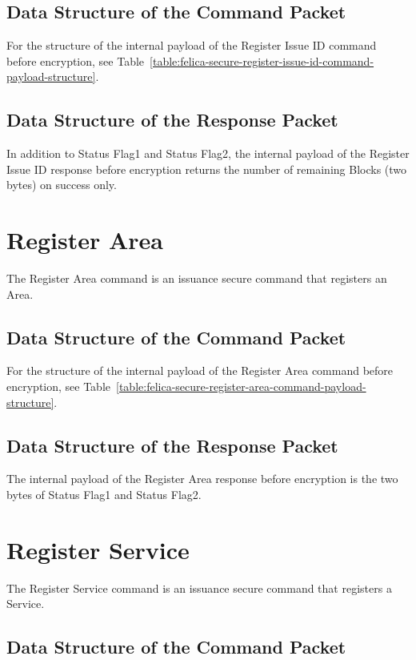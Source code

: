 \documentclass[a4paper,11pt]{report}
\begin{document}
\subsection{Data Structure of the Command Packet}

For the structure of the internal payload of the Register Issue ID command before encryption, see Table~\ref{table:felica-secure-register-issue-id-command-payload-structure}.

\subsection{Data Structure of the Response Packet}

In addition to Status Flag1 and Status Flag2, the internal payload of the Register Issue ID response before encryption returns the number of remaining Blocks (two bytes) on success only.

\section{Register Area}

The Register Area command is an issuance secure command that registers an Area.

\subsection{Data Structure of the Command Packet}

For the structure of the internal payload of the Register Area command before encryption, see Table~\ref{table:felica-secure-register-area-command-payload-structure}.

\subsection{Data Structure of the Response Packet}

The internal payload of the Register Area response before encryption is the two bytes of Status Flag1 and Status Flag2.

\section{Register Service}

The Register Service command is an issuance secure command that registers a Service.

\subsection{Data Structure of the Command Packet}
\end{document}
